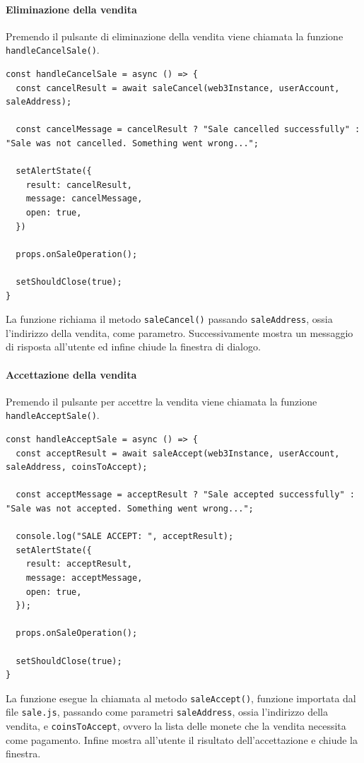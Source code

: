 \documentclass[a4paper]{article}
\begin{document}
        \paragraph{Eliminazione della vendita}
        Premendo il pulsante di eliminazione della vendita viene chiamata la funzione \verb|handleCancelSale()|.
\begin{lstlisting}[style=ES6, title={Funzione handleCancelSale()}]
const handleCancelSale = async () => {
  const cancelResult = await saleCancel(web3Instance, userAccount, saleAddress);

  const cancelMessage = cancelResult ? "Sale cancelled successfully" : "Sale was not cancelled. Something went wrong...";

  setAlertState({
    result: cancelResult,
    message: cancelMessage,
    open: true,
  })

  props.onSaleOperation();

  setShouldClose(true);
}\end{lstlisting}
        La funzione richiama il metodo \verb|saleCancel()| passando \verb|saleAddress|, ossia l'indirizzo della vendita, come parametro. Successivamente mostra un messaggio di risposta all'utente ed infine chiude la finestra di dialogo.
        \paragraph{Accettazione della vendita}
        Premendo il pulsante per accettre la vendita viene chiamata la funzione \verb|handleAcceptSale()|.
\begin{lstlisting}[style=ES6, title={Funzione handleAcceptSale()}]
const handleAcceptSale = async () => {
  const acceptResult = await saleAccept(web3Instance, userAccount, saleAddress, coinsToAccept);

  const acceptMessage = acceptResult ? "Sale accepted successfully" : "Sale was not accepted. Something went wrong...";

  console.log("SALE ACCEPT: ", acceptResult);
  setAlertState({
    result: acceptResult,
    message: acceptMessage,
    open: true,
  });

  props.onSaleOperation();

  setShouldClose(true);
}\end{lstlisting}
        La funzione esegue la chiamata al metodo \verb|saleAccept()|, funzione importata dal file \verb|sale.js|, passando come parametri \verb|saleAddress|, ossia l'indirizzo della vendita, e \verb|coinsToAccept|, ovvero la lista delle monete che la vendita necessita come pagamento.
        Infine mostra all'utente il risultato dell'accettazione e chiude la finestra.

        \newpage
        \printbibliography
\end{document}
